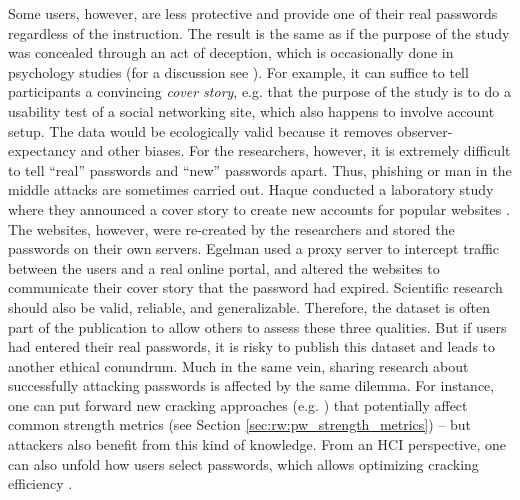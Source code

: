 Some users, however, are less protective and provide one of their real passwords regardless of the instruction. The result is the same as if the purpose of the study was concealed through an act of deception, which is occasionally done in psychology studies (for a discussion see \cite{Tai2012Deception}). For example, it can suffice to tell participants a convincing \textit{cover story}, e.g. that the purpose of the study is to do a usability test of a social networking site, which also happens to involve account setup. The data would be ecologically valid because it removes observer-expectancy and other biases. For the researchers, however, it is extremely difficult to tell ``real'' passwords and ``new'' passwords apart. Thus, phishing or man in the middle attacks are sometimes carried out. Haque \etal conducted a laboratory study where they announced a cover story to create new accounts for popular websites \cite{Haque2014Hierarchy}. The websites, however, were re-created by the researchers and stored the passwords on their own servers. Egelman \etal used a proxy server to intercept traffic between the users and a real online portal, and altered the websites to communicate their cover story that the password had expired. Scientific research should also be valid, reliable, and generalizable. Therefore, the dataset is often part of the publication to allow others to assess these three qualities. But if users had entered their real passwords, it is risky to publish this dataset and leads to another ethical conundrum. 
Much in the same vein, sharing research about successfully attacking passwords is affected by the same dilemma. For instance, one can put forward new cracking approaches (e.g. \cite{Marechal2008AdvancesPWCracking, Narayanan2005FastDictionaryAttacks, Schmidt2013Pitfalls, Weir2009PCFG}) that potentially affect common strength metrics (see Section \ref{sec:rw:pw_strength_metrics}) -- but attackers also benefit from this kind of knowledge. From an HCI perspective, one can also unfold how users select passwords, which allows optimizing cracking efficiency \cite{Weir2010MetricsPolicies, Wheeler2016zxcvbn}. 

